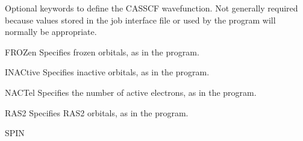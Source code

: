 Optional keywords to define the CASSCF wavefunction. Not generally required
because values stored in the job interface
file or used by the  program will normally be appropriate.
\begin{keywordlist}
\item[FROZen]
Specifies frozen orbitals, as in the  program.
\item[INACtive]
Specifies inactive orbitals, as in the  program.
\item[NACTel]
Specifies the number of active electrons, as in the  program.
\item[RAS2]
Specifies RAS2 orbitals, as in the  program.
\item[SPIN]

\end{keywordlist}
